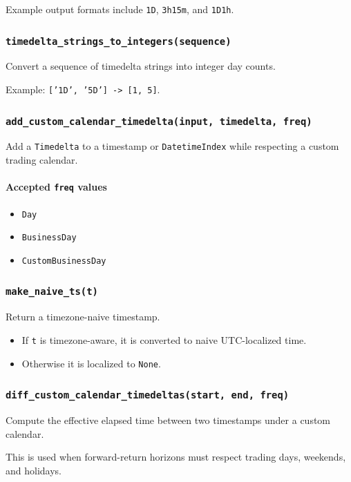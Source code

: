 \documentclass[11pt]{article}
\begin{document}
Example output formats include \texttt{1D}, \texttt{3h15m}, and \texttt{1D1h}.

\subsubsection{\texttt{timedelta\_strings\_to\_integers(sequence)}}
Convert a sequence of timedelta strings into integer day counts.

Example: \texttt{['1D', '5D'] -> [1, 5]}.

\subsubsection{\texttt{add\_custom\_calendar\_timedelta(input, timedelta, freq)}}
Add a \texttt{Timedelta} to a timestamp or \texttt{DatetimeIndex} while respecting a custom trading calendar.

\paragraph{Accepted \texttt{freq} values}
\begin{itemize}
  \item \texttt{Day}
  \item \texttt{BusinessDay}
  \item \texttt{CustomBusinessDay}
\end{itemize}

\subsubsection{\texttt{make\_naive\_ts(t)}}
Return a timezone-naive timestamp.

\begin{itemize}
  \item If \texttt{t} is timezone-aware, it is converted to naive UTC-localized time.
  \item Otherwise it is localized to \texttt{None}.
\end{itemize}

\subsubsection{\texttt{diff\_custom\_calendar\_timedeltas(start, end, freq)}}
Compute the effective elapsed time between two timestamps under a custom calendar.

This is used when forward-return horizons must respect trading days, weekends, and holidays.
\end{document}
